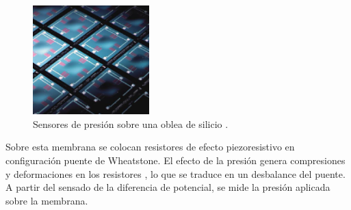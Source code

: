 \begin{figure}[H]
    \centering
    \includegraphics[width=0.4\textwidth]{img/MEMS_barometro.png}
    \caption{Sensores de presión sobre una oblea de silicio \cite{baro_1}.}
    \label{fig:MEMS_barometro}
\end{figure}

Sobre esta membrana se colocan resistores de efecto piezoresistivo en configuración puente de Wheatstone. El efecto de la presión genera compresiones y deformaciones en los resistores \cite{baro_3}, lo que se traduce en un desbalance del puente. A partir del sensado de la diferencia de potencial, se mide la presión aplicada sobre la membrana.








